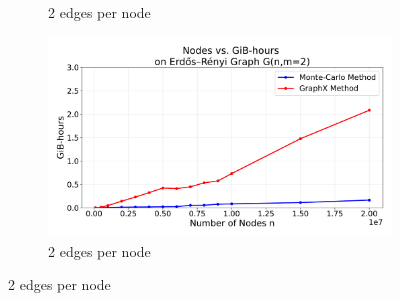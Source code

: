 \begin{figure}[H]
\begin{subfigure}[t]{0.75\linewidth}
        \caption{2 edges per node}
        \label{fig:2cost}
    \end{subfigure}
    \begin{subfigure}[t]{0.75\linewidth}
        \centering
        \includegraphics[width=\linewidth]{images/plots/ER_2edg/gbhrs_nodes_er_graph_2edges.pdf}
        \caption{2 edges per node}
        \label{fig:2cost}
    \end{subfigure}
\end{figure}




